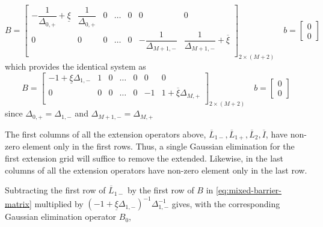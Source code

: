 \documentclass[11pt]{article}
\theoremstyle{definition}
\begin{document}
\begin{equation}\label{eq:mixed-barrier-matrix-original}
B = \begin{bmatrix}
-\dfrac{1}{\Delta_{0,+}} + \underline{\xi} & \dfrac{1}{\Delta_{0,+}} & 0 & \dots & 0 & 0 & 0 \\
0 & 0 & 0 & \dots & 0 & -\dfrac{1}{\Delta_{M+1,-}} & \dfrac{1}{\Delta_{M+1,-}} + \overline{\xi}\\
\end{bmatrix}_{2 \times (M+2)} \quad 
b = \begin{bmatrix}
0 \\
0
\end{bmatrix}
\end{equation}
which provides the identical system as
\begin{equation}\label{eq:mixed-barrier-matrix}
B = \begin{bmatrix}
-1 +  \underline{\xi} \Delta_{1,-} & 1 & 0 & \dots & 0 & 0 & 0 \\
0 & 0 & 0 & \dots & 0 & -1 & 1 + \overline{\xi} \Delta_{M,+}\\
\end{bmatrix}_{2 \times (M+2)} \quad 
b = \begin{bmatrix}
0 \\
0
\end{bmatrix}
\end{equation}
since $\Delta_{0,+} = \Delta_{1,-}$ and $\Delta_{M+1,-} = \Delta_{M,+}$


The first columns of all the extension operators above, $\overline{L}_{1-}, \overline{L}_{1+}, \overline{L}_{2}, \overline{I}$, have non-zero element only in the first rows. Thus, a single Gaussian elimination for the first extension grid will suffice to remove the extended. Likewise, in the last columns of all the extension operators have non-zero element only in the last row. 

Subtracting the first row of $\overline{L}_{1-}$ by the first row of $B$ in \eqref{eq:mixed-barrier-matrix} multiplied by $(-1 + \underline{\xi} \Delta_{1,-} )^{-1}\Delta_{1,-}^{-1}$ gives, with the corresponding Gaussian elimination operator $B_0$,
\end{document}
